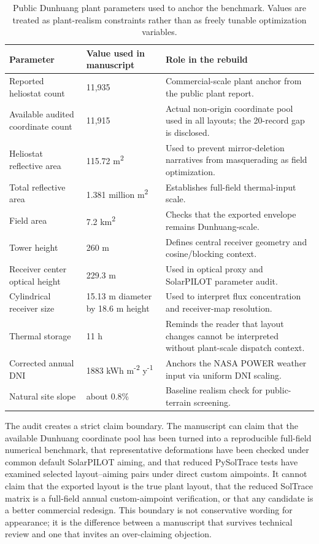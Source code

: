 \documentclass[final,3p,times]{elsarticle}
\begin{document}
\begin{table}[t]
\centering
\caption{Public Dunhuang plant parameters used to anchor the benchmark. Values are treated as plant-realism constraints rather than as freely tunable optimization variables.}
\label{tab:plant-audit}
\small
\begin{tabular}{p{}p{}p{}}
\toprule
Parameter & Value used in manuscript & Role in the rebuild \\
\midrule
Reported heliostat count & 11,935 & Commercial-scale plant anchor from the public plant report. \\
Available audited coordinate count & 11,915 & Actual non-origin coordinate pool used in all layouts; the 20-record gap is disclosed. \\
Heliostat reflective area & 115.72 m\textsuperscript{2} & Used to prevent mirror-deletion narratives from masquerading as field optimization. \\
Total reflective area & 1.381 million m\textsuperscript{2} & Establishes full-field thermal-input scale. \\
Field area & 7.2 km\textsuperscript{2} & Checks that the exported envelope remains Dunhuang-scale. \\
Tower height & 260 m & Defines central receiver geometry and cosine/blocking context. \\
Receiver center optical height & 229.3 m & Used in optical proxy and SolarPILOT parameter audit. \\
Cylindrical receiver size & 15.13 m diameter by 18.6 m height & Used to interpret flux concentration and receiver-map resolution. \\
Thermal storage & 11 h & Reminds the reader that layout changes cannot be interpreted without plant-scale dispatch context. \\
Corrected annual DNI & 1883 kWh m\textsuperscript{-2} y\textsuperscript{-1} & Anchors the NASA POWER weather input via uniform DNI scaling. \\
Natural site slope & about 0.8\% & Baseline realism check for public-terrain screening. \\
\bottomrule
\end{tabular}
\end{table}

The audit creates a strict claim boundary. The manuscript can claim that the available Dunhuang coordinate pool has been turned into a reproducible full-field numerical benchmark, that representative deformations have been checked under common default SolarPILOT aiming, and that reduced PySolTrace tests have examined selected layout--aiming pairs under direct custom aimpoints. It cannot claim that the exported layout is the true plant layout, that the reduced SolTrace matrix is a full-field annual custom-aimpoint verification, or that any candidate is a better commercial redesign. This boundary is not conservative wording for appearance; it is the difference between a manuscript that survives technical review and one that invites an over-claiming objection.
\end{document}
